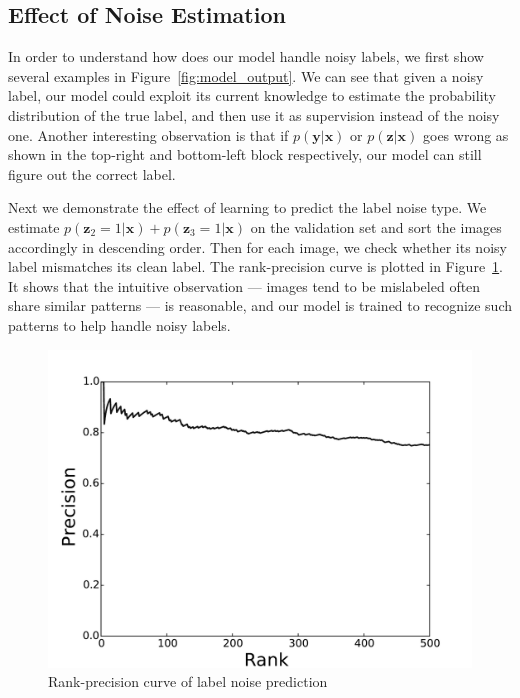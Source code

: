 \documentclass[10pt,twocolumn,letterpaper]{article}
\def\vec{\mathbf}
\begin{document}
\subsection{Effect of Noise Estimation} %
\label{sub:effect_of_noise_estimation}
In order to understand how does our model handle noisy labels, we first show several examples in Figure~\ref{fig:model_output}. We can see that given a noisy label, our model could exploit its current knowledge to estimate the probability distribution of the true label, and then use it as supervision instead of the noisy one. Another interesting observation is that if $p(\vec{y}|\vec{x})$ or $p(\vec{z}|\vec{x})$ goes wrong as shown in the top-right and bottom-left block respectively, our model can still figure out the correct label.

Next we demonstrate the effect of learning to predict the label noise type. We estimate $p(\vec{z}_2=1|\vec{x})+p(\vec{z}_3=1|\vec{x})$ on the validation set and sort the images accordingly in descending order. Then for each image, we check whether its noisy label mismatches its clean label. The rank-precision curve is plotted in Figure~\ref{fig:noise_prediction_rp}. It shows that the intuitive observation --- images tend to be mislabeled often share similar patterns --- is reasonable, and our model is trained to recognize such patterns to help handle noisy labels.

\begin{figure}[t]
\begin{center}
\includegraphics[width=0.8\linewidth]{figure/noise_prediction_rank_precision.pdf}
\end{center}
\caption{Rank-precision curve of label noise prediction}
\label{fig:noise_prediction_rp}
\end{figure}
\end{document}
